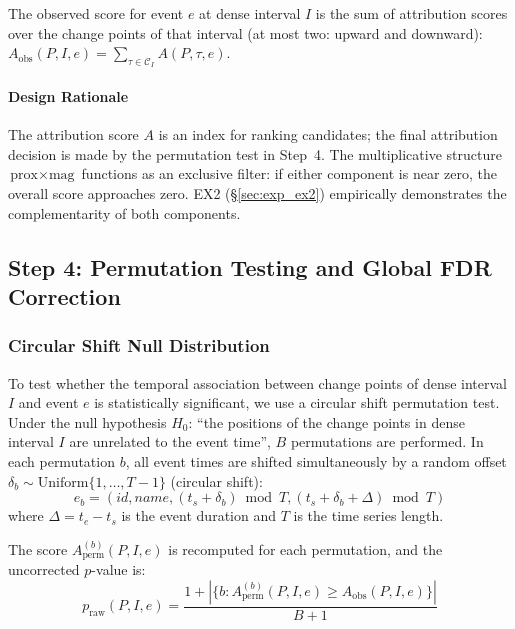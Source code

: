The observed score for event $e$ at dense interval $I$ is the sum of attribution scores
over the change points of that interval (at most two: upward and downward):
$A_{\text{obs}}(P, I, e) = \sum_{\tau \in \mathcal{C}_I} A(P, \tau, e)$.

\paragraph{Design Rationale}
The attribution score $A$ is an index for ranking candidates;
the final attribution decision is made by the permutation test in Step~4.
The multiplicative structure $\text{prox} \times \text{mag}$ functions as an
exclusive filter: if either component is near zero, the overall score approaches zero.
EX2 (\S\ref{sec:exp_ex2}) empirically demonstrates the complementarity of both components.

\subsection{Step 4: Permutation Testing and Global FDR Correction}

\subsubsection{Circular Shift Null Distribution}

To test whether the temporal association between change points of dense interval $I$
and event $e$ is statistically significant, we use a circular shift permutation test.
Under the null hypothesis $H_0$: ``the positions of the change points in dense interval $I$
are unrelated to the event time'',
$B$ permutations are performed.
In each permutation $b$, all event times are shifted simultaneously
by a random offset $\delta_b \sim \text{Uniform}\{1, \ldots, T-1\}$ (circular shift):
\begin{equation}
e_b = (\textit{id}, \textit{name}, (t_s + \delta_b) \bmod T, (t_s + \delta_b + \Delta) \bmod T)
\end{equation}
where $\Delta = t_e - t_s$ is the event duration and $T$ is the time series length.

The score $A_{\text{perm}}^{(b)}(P, I, e)$ is recomputed for each permutation,
and the uncorrected $p$-value is:
\begin{equation}
p_{\text{raw}}(P, I, e) = \frac{1 + |\{b : A_{\text{perm}}^{(b)}(P, I, e) \geq A_{\text{obs}}(P, I, e)\}|}{B + 1}
\label{eq:pvalue}
\end{equation}

